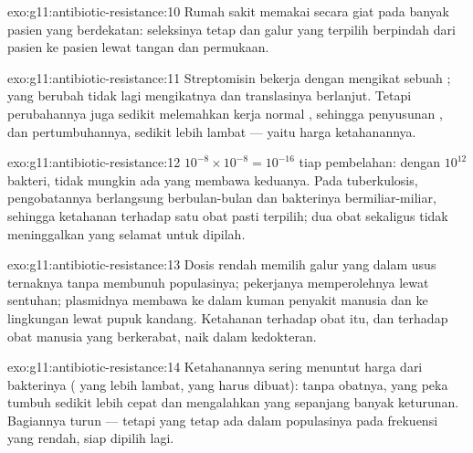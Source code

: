 \begin{solution}{exo:g11:antibiotic-resistance:10}
Rumah sakit memakai  secara giat pada banyak pasien yang
berdekatan: seleksinya tetap dan galur yang terpilih berpindah dari
pasien ke pasien lewat tangan dan permukaan.
\end{solution}

\begin{solution}{exo:g11:antibiotic-resistance:11}
Streptomisin bekerja dengan mengikat sebuah  ; 
yang berubah tidak lagi mengikatnya dan translasinya berlanjut. Tetapi
perubahannya juga sedikit melemahkan kerja normal , sehingga
penyusunan , dan pertumbuhannya, sedikit lebih lambat ---
yaitu harga ketahanannya.
\end{solution}

\begin{solution}{exo:g11:antibiotic-resistance:12}
$10^{-8} \times 10^{-8} = 10^{-16}$ tiap pembelahan: dengan $10^{12}$
bakteri, tidak mungkin ada  yang membawa keduanya. Pada
tuberkulosis, pengobatannya berlangsung berbulan-bulan dan bakterinya
bermiliar-miliar, sehingga ketahanan terhadap satu obat pasti terpilih;
dua obat sekaligus tidak meninggalkan yang selamat untuk dipilah.
\end{solution}

\begin{solution}{exo:g11:antibiotic-resistance:13}
Dosis rendah memilih galur yang  dalam usus ternaknya tanpa
membunuh populasinya; pekerjanya memperolehnya lewat sentuhan;
plasmidnya membawa  ke dalam kuman penyakit manusia dan ke
lingkungan lewat pupuk kandang. Ketahanan terhadap obat itu, dan
terhadap obat manusia yang berkerabat, naik dalam kedokteran.
\end{solution}

\begin{solution}{exo:g11:antibiotic-resistance:14}
Ketahanannya sering menuntut harga dari bakterinya ( yang lebih
lambat,  yang harus dibuat): tanpa obatnya,  yang peka tumbuh
sedikit lebih cepat dan mengalahkan yang  sepanjang banyak
keturunan. Bagiannya turun --- tetapi  yang  tetap ada dalam
populasinya pada frekuensi yang rendah, siap dipilih lagi.
\end{solution}

